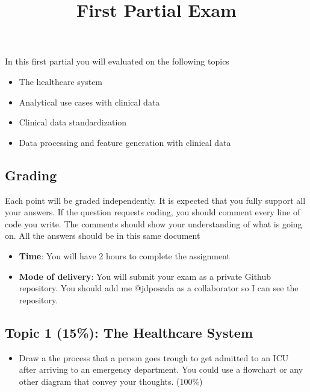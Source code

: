 \documentclass[
]{article}
\title{First Partial Exam}
\author{}
\date{\vspace{-2.5em}}
\providecommand{\tightlist}{%
  \setlength{\itemsep}{0pt}\setlength{\parskip}{0pt}}
\begin{document}
\maketitle

In this first partial you will evaluated on the following topics

\begin{itemize}
\tightlist
\item
  The healthcare system
\item
  Analytical use cases with clinical data
\item
  Clinical data standardization
\item
  Data processing and feature generation with clinical data
\end{itemize}

\hypertarget{grading}{%
\subsection{Grading}\label{grading}}

Each point will be graded independently. It is expected that you fully
support all your answers. If the question requests coding, you should
comment every line of code you write. The comments should show your
understanding of what is going on. All the answers should be in this
same document

\begin{itemize}
\tightlist
\item
  \textbf{Time}: You will have 2 hours to complete the assignment
\item
  \textbf{Mode of delivery}: You will submit your exam as a private
  Github repository. You should add me @jdposada as a collaborator so I
  can see the repository.
\end{itemize}

\hypertarget{topic-1-15-the-healthcare-system}{%
\subsection{Topic 1 (15\%): The Healthcare
System}\label{topic-1-15-the-healthcare-system}}

\begin{itemize}
\tightlist
\item
  Draw a the process that a person goes trough to get admitted to an ICU
  after arriving to an emergency department. You could use a flowchart
  or any other diagram that convey your thoughts. (100\%)
\end{itemize}
\end{document}
